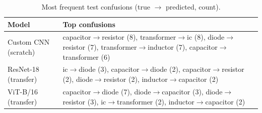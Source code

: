 \begin{table}[H]\centering\small
\caption{Most frequent test confusions (true $\rightarrow$ predicted, count).}\label{tab:confusions}
\begin{tabular}{lp{11cm}}\toprule
Model & Top confusions \\\midrule
Custom CNN (scratch) & capacitor$\rightarrow$resistor (8), transformer$\rightarrow$ic (8), diode$\rightarrow$resistor (7), transformer$\rightarrow$inductor (7), capacitor$\rightarrow$transformer (6) \\
ResNet-18 (transfer) & ic$\rightarrow$diode (3), capacitor$\rightarrow$diode (2), capacitor$\rightarrow$resistor (2), diode$\rightarrow$resistor (2), inductor$\rightarrow$capacitor (2) \\
ViT-B/16 (transfer) & capacitor$\rightarrow$diode (7), diode$\rightarrow$capacitor (3), diode$\rightarrow$resistor (3), ic$\rightarrow$transformer (2), inductor$\rightarrow$capacitor (2) \\
\bottomrule\end{tabular}\end{table}